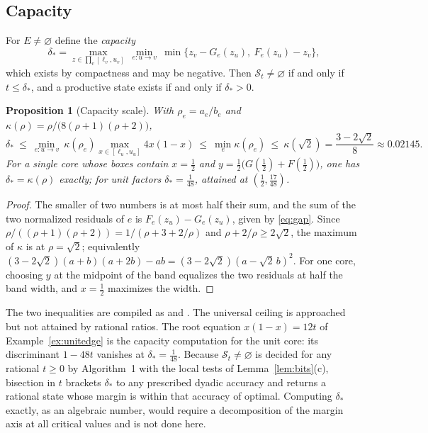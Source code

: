 \documentclass[11pt,a4paper]{article}
\theoremstyle{plain}
\newtheorem{proposition}[theorem]{Proposition}
\theoremstyle{definition}
\theoremstyle{remark}
\newcommand{\St}{\mathcal{S}_t}
\begin{document}
\subsection{Capacity}
For $E\neq\varnothing$ define the \emph{capacity}
\[
  \delta_*=\max_{z\in\prod_v[\ell_v,u_v]}\ \min_{e\colon u\to v}\ \min\bigl\{z_v-G_e(z_u),\ F_e(z_u)-z_v\bigr\},
\]
which exists by compactness and may be negative. Then $\St\neq\varnothing$ if and only if $t\le\delta_*$, and a productive state exists if and only if $\delta_*>0$.

\begin{proposition}[Capacity scale]\label{prop:capacity}
With $\rho_e=a_e/b_e$ and $\kappa(\rho)=\rho/\bigl(8(\rho+1)(\rho+2)\bigr)$,
\begin{equation}\label{eq:capacity}
  \delta_*\ \le\ \min_{e\colon u\to v}\ \kappa(\rho_e)\max_{x\in[\ell_u,u_u]}4x(1-x)\ \le\ \min_e\kappa(\rho_e)\ \le\ \kappa(\sqrt2)=\frac{3-2\sqrt2}{8}\approx0.02145 .
\end{equation}
For a single core whose boxes contain $x=\tfrac12$ and $y=\tfrac12\bigl(G(\tfrac12)+F(\tfrac12)\bigr)$, one has $\delta_*=\kappa(\rho)$ exactly; for unit factors $\delta_*=\tfrac1{48}$, attained at $(\tfrac12,\tfrac{17}{48})$.
\end{proposition}
\begin{proof}
The smaller of two numbers is at most half their sum, and the sum of the two normalized residuals of $e$ is $F_e(z_u)-G_e(z_u)$, given by \eqref{eq:gap}. Since $\rho/((\rho+1)(\rho+2))=1/(\rho+3+2/\rho)$ and $\rho+2/\rho\ge2\sqrt2$, the maximum of $\kappa$ is at $\rho=\sqrt2$; equivalently $(3-2\sqrt2)(a+b)(a+2b)-ab=(3-2\sqrt2)(a-\sqrt2\,b)^2$. For one core, choosing $y$ at the midpoint of the band equalizes the two residuals at half the band width, and $x=\tfrac12$ maximizes the width.
\end{proof}

The two inequalities are compiled as  and . The universal ceiling is approached but not attained by rational ratios. The root equation $x(1-x)=12t$ of Example~\ref{ex:unitedge} is the capacity computation for the unit core: its discriminant $1-48t$ vanishes at $\delta_*=\tfrac1{48}$. Because $\St\ne\varnothing$ is decided for any rational $t\ge0$ by Algorithm~1 with the local tests of Lemma~\ref{lem:bits}(c), bisection in $t$ brackets $\delta_*$ to any prescribed dyadic accuracy and returns a rational state whose margin is within that accuracy of optimal. Computing $\delta_*$ exactly, as an algebraic number, would require a decomposition of the margin axis at all critical values and is not done here.
\end{document}
